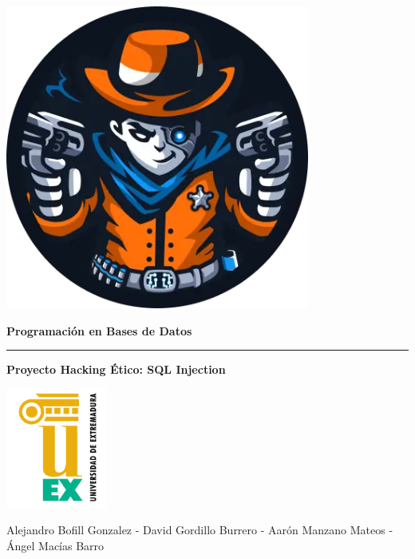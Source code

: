 \documentclass[a4paper,12pt]{article}
\begin{document}
\begin{titlepage}
    \centering

    \includegraphics[width=0.75\textwidth]{Imagenes/fotoportada.png} %

    \vspace{1cm}

    {\Huge \textbf{Programación en Bases de Datos} \par}

    \vspace{0.3cm}

    \rule{\linewidth}{0.1mm}

    \vspace{0.3cm}

    {\LARGE \textbf{Proyecto Hacking Ético: SQL Injection} \par}

    \vspace{1.5cm}

    \includegraphics[width=0.25\textwidth]{Imagenes/logounex.png} %

    \vfill

    {\footnotesize Alejandro Bofill Gonzalez - David Gordillo Burrero - Aarón Manzano Mateos - Ángel Macías Barro \par}

\end{titlepage}
\end{document}
